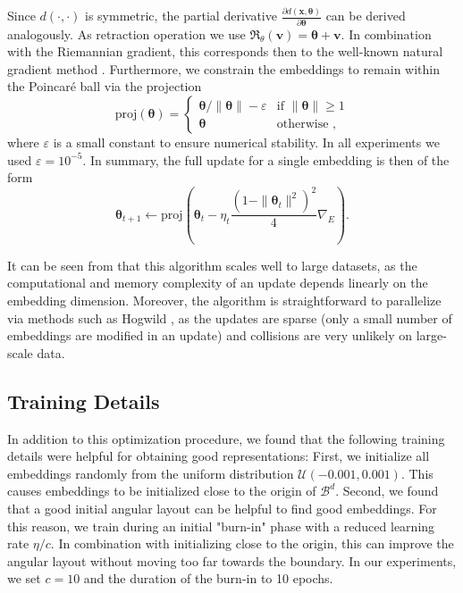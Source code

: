 \documentclass[11pt]{article}
\renewcommand{\vec}[1]{\bm{#1}}
\newcommand{\vv}{\vec{v}}
\newcommand{\vt}{\vec{\theta}}
\newcommand{\vx}{\vec{x}}
\newcommand{\Set}[1]{\mathcal{#1}}
\newcommand{\manifold}[1]{\mathcal{#1}}
\newcommand{\retract}{\mathfrak{R}}
\begin{document}
Since \(d(\cdot, \cdot)\) is symmetric, the partial derivative \(\frac{\partial d(\vx, \vt)}{\partial
\vt}\) can be derived analogously. As retraction operation we use
\(\retract_\theta(\vv) = \vt + \vv\). In combination with the Riemannian gradient,
this corresponds then to the well-known natural gradient method
\cite{DBLP:journals/neco/Amari98}. Furthermore, we constrain the embeddings to
remain within the Poincaré ball via the projection
\begin{equation*}
  \text{proj}(\vt) = \begin{cases}
  \vt / \|\vt\| - \varepsilon & \text{if }\|\vt\| \geq 1 \\
  \vt & \text{otherwise ,}
  \end{cases}
\end{equation*}
where \(\varepsilon\) is a small constant to ensure numerical stability. In all experiments we used \(\varepsilon = 10^{-5}\).
In summary, the full update for a single embedding is then of the form
\begin{equation}
  \vt_{t+1} \gets \text{proj}\left(\vt_t - \eta_t \frac{(1 - \|\vt_t\|^2)^2}{4} \nabla_E \right) \label{eq:update} .
\end{equation}

It can be seen from  that this algorithm scales well
to large datasets, as the computational and memory complexity of an update depends linearly
on the embedding dimension. Moreover, the algorithm is straightforward to parallelize via
methods such as Hogwild \cite{DBLP:conf/nips/RechtRWN11}, as the updates are
sparse (only a small number of embeddings are modified in an update) and
collisions are very unlikely on large-scale data.

\subsection{Training Details}
\label{sec:org5b48fd6}
In addition to this optimization procedure, we found that the following training
details were helpful for obtaining good representations: First, we initialize
all embeddings randomly from the uniform distribution \({\Set{U}(-0.001,0.001)}\).
This causes embeddings to be initialized close to the origin of \(\manifold{B}^d\).
Second, we found that a good initial angular layout can be helpful to find good
embeddings. For this reason, we train during an initial "burn-in" phase with a
reduced learning rate \(\eta / c\). In combination with initializing close to the
origin, this can improve the angular layout without moving too far towards the
boundary. In our experiments, we set \({c=10}\) and the duration of the burn-in to
10 epochs.
\end{document}
